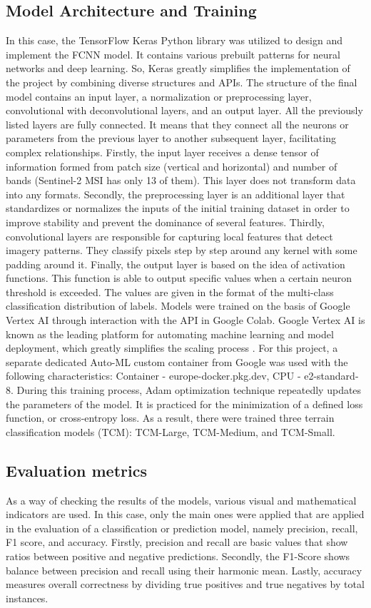 \documentclass[3p,times,procedia]{elsarticle}
\begin{document}
\subsection{Model Architecture and Training}
In this case, the TensorFlow Keras Python library was utilized to design and implement the FCNN model. It contains various prebuilt patterns for neural networks and deep learning. So, Keras greatly simplifies the implementation of the project by combining diverse structures and APIs. The structure of the final model contains an input layer, a normalization or preprocessing layer, convolutional with deconvolutional layers, and an output layer. All the previously listed layers are fully connected. It means that they connect all the neurons or parameters from the previous layer to another subsequent layer, facilitating complex relationships. Firstly, the input layer receives a dense tensor of information formed from patch size (vertical and horizontal) and number of bands (Sentinel-2 MSI has only 13 of them). This layer does not transform data into any formats. Secondly, the preprocessing layer is an additional layer that standardizes or normalizes the inputs of the initial training dataset in order to improve stability and prevent the dominance of several features. Thirdly, convolutional layers are responsible for capturing local features that detect imagery patterns. They classify pixels step by step around any kernel with some padding around it. Finally, the output layer is based on the idea of activation functions. This function is able to output specific values when a certain neuron threshold is exceeded. The values are given in the format of the multi-class classification distribution of labels. Models were trained on the basis of Google Vertex AI through interaction with the API in Google Colab. Google Vertex AI is known as the leading platform for automating machine learning and model deployment, which greatly simplifies the scaling process \cite{Berg2022}. For this project, a separate dedicated Auto-ML custom container from Google was used with the following characteristics: Container - europe-docker.pkg.dev, CPU - e2-standard-8. During this training process, Adam optimization technique repeatedly updates the parameters of the model. It is practiced for the minimization of a defined loss function, or cross-entropy loss. As a result, there were trained three terrain classification models (TCM): TCM-Large, TCM-Medium, and TCM-Small.

\subsection{Evaluation metrics}
As a way of checking the results of the models, various visual and mathematical indicators are used. In this case, only the main ones were applied that are applied in the evaluation of a classification or prediction model, namely precision, recall, F1 score, and accuracy. Firstly, precision and recall are basic values that show ratios between positive and negative predictions. Secondly, the F1-Score shows balance between precision and recall using their harmonic mean. Lastly, accuracy measures overall correctness by dividing true positives and true negatives by total instances.
\end{document}
